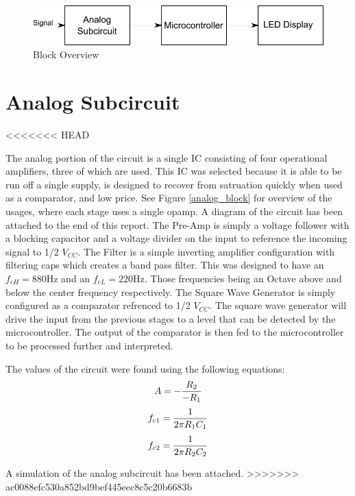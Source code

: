 \documentclass[12pt]{article}
\begin{document}
\begin{figure}[H]
\centering
	\includegraphics[width=6in]{"Block Overview"}
	\caption{Block Overview}
	\label{block_overview} 
\end{figure}

\section{Analog Subcircuit}
<<<<<<< HEAD

The analog portion of the circuit is a single IC consisting of four operational amplifiers, three of which are used. This IC was selected because it is able to be run off a single supply, is designed to recover from satruation quickly when used as a comparator, and low price. See Figure \ref{analog_block} for overview of the usages, where each stage uses a single opamp. A diagram of the circuit has been attached to the end of this report. The Pre-Amp is simply a voltage follower with a blocking capacitor and a voltage divider on the input to reference the incoming signal to 1/2 $V_{CC}$. The Filter is a simple inverting amplifier configuration with filtering caps which creates a band pass filter. This was designed to have an $f_{cH }= 880 \mbox{Hz}$ and an $f_{cL} = 220 \mbox{Hz}$. Those frequencies being an Octave above and below the center frequency respectively. The Square Wave Generator is simply configured as a comparator refrenced to 1/2 $V_{CC}$. The square wave generator will drive the input from the previous stages to a level that can be detected by the microcontroller. The output of the comparator is then fed to the microcontroller to be processed further and interpreted.

The values of the circuit were found using the following equations: 
\begin{equation}
A = -{ R_2 \over -R_1}
\end{equation}
\begin{equation}
f_{c1} = {1 \over {2 \pi R_1 C_1}}
\end{equation}
\begin{equation}
f_{c2} = {1 \over {2 \pi R_2 C_2}}
\end{equation}


A simulation of the analog subcircuit has been attached.
>>>>>>> ac0088efc530a852bd9bef445eec8c5c20b6683b
\end{document}
